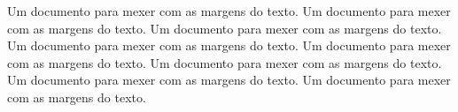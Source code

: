 \documentclass[12pt,article,a4paper,oneside]{memoir}
\begin{document}
Um documento para mexer com as margens do texto. Um documento para mexer com as margens do texto. Um documento para mexer com as margens do texto. Um documento para mexer com as margens do texto. Um documento para mexer com as margens do texto. Um documento para mexer com as margens do texto. Um documento para mexer com as margens do texto. Um documento para mexer com as margens do texto. 
\end{document}
